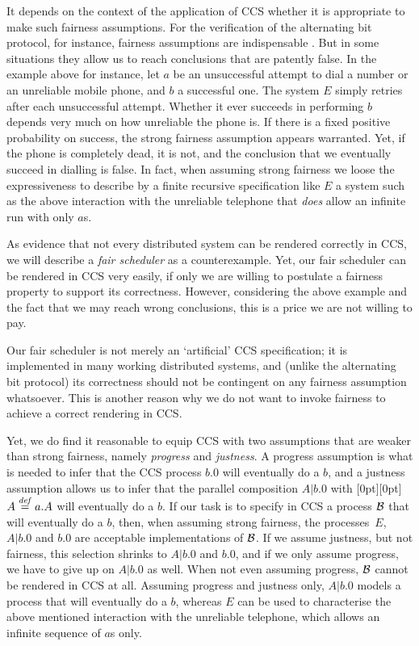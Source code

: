 \documentclass[smallcondensed]{svjour3}
\newcommand{\plat}[1]{\raisebox{0pt}[0pt][0pt]{#1}}  \def\precond#1{{\vphantom{#1}}^\bullet #1}
\begin{document}
\advance\textheight -1pt
It depends on the context of the application of CCS whether it is appropriate to make such fairness assumptions.
For the verification of the alternating bit protocol, for instance, fairness assumptions are
indispensable \cite{BergstraKlop85}. But in some situations they allow us to reach conclusions that are
patently false. In the example above for instance, let $a$ be an unsuccessful attempt to dial a
number or an unreliable mobile phone, and $b$ a successful one. The system $E$ simply
retries after each unsuccessful attempt. Whether it ever succeeds in performing $b$ depends very
much on how unreliable the phone is. If there is a fixed positive probability on success,
the strong fairness assumption appears warranted. Yet, if the phone is completely dead, it is not,
and the conclusion that we eventually succeed in dialling is false.
In fact, when assuming strong fairness we loose the expressiveness to describe by a finite
recursive specification like $E$ a system such as the above interaction with the unreliable 
telephone that \emph{does} allow an infinite run with only $a$s.

As evidence that not every distributed system can be rendered correctly in CCS, we will describe a
\emph{fair scheduler} as a counterexample. Yet, our fair scheduler can be rendered in CCS very
easily, if only we are willing to postulate a fairness property to support its correctness.
However, considering the above example and the fact that we 
may reach wrong conclusions, this is a price we are not willing to pay.

Our fair scheduler is not merely an `artificial' CCS specification; it is implemented in many working distributed systems, and (unlike the alternating bit
protocol) its correctness should not be contingent on any fairness assumption whatsoever.
This is another reason why we do not want to invoke fairness to achieve a correct rendering in CCS\@.

Yet, we do find it reasonable to equip CCS with two assumptions that are weaker than strong fairness,
namely \emph{progress} and \emph{justness}. A progress assumption is what is needed to infer that
the CCS process $b.0$ will eventually do a $b$, and a justness assumption allows us to infer that
the parallel composition $A|b.0$ with \plat{$A \stackrel{{\it def}}{=} a.A$} will eventually do a $b$.
If our task is to specify in CCS a process $\cal{B}$ that will eventually do a $b$,
then, when assuming strong fairness,
the processes~$E$,  $A|b.0$ and $b.0$ are acceptable implementations of $\cal{B}$.
If we assume justness, but not fairness, this selection shrinks to $A|b.0$ and $b.0$, and if we only
assume progress, we have to give up on $A|b.0$ as well. When not even assuming progress, $\cal{B}$
cannot be rendered in CCS at all.
Assuming progress and justness only, $A|b.0$ models a process that will
eventually do a $b$, whereas $E$ can be used to characterise the above mentioned interaction with the unreliable telephone,
which allows an infinite sequence of $a$s only.
\end{document}
